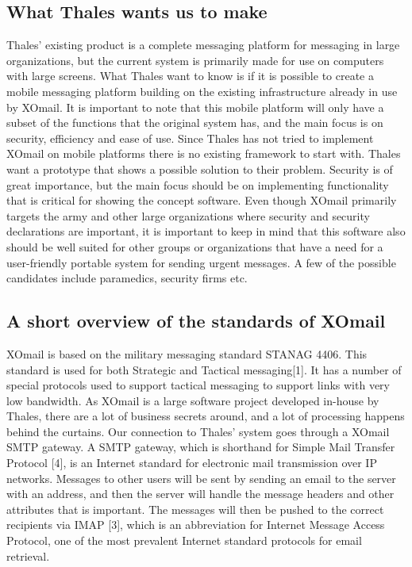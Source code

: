 \subsection*{What Thales wants us to make}
Thales’ existing product is a complete messaging platform for messaging in large organizations, but the current system is primarily made for use on computers with large screens. What Thales want to know is if it is possible to create a mobile messaging platform building on the existing infrastructure already in use by XOmail. It is important to note that this mobile platform will only have a subset of the functions that the original system has, and the main focus is on security, efficiency and ease of use.
\newline
\newline
Since Thales has not tried to implement XOmail on mobile platforms there is no existing framework to start with. Thales want a prototype that shows a possible solution to their problem. Security is of great importance, but the main focus should be on implementing functionality that is critical for showing the concept software.  
\newline
\newline
Even though XOmail primarily targets the army and other large organizations where security and security declarations are important, it is important to keep in mind that this software also should be well suited for other groups or organizations that have a need for a user-friendly portable system for sending urgent messages. A few of the possible candidates include paramedics, security firms etc. 

\subsection*{A short overview of the standards of XOmail}
XOmail is based on the military messaging standard STANAG 4406. This standard is used for both Strategic and Tactical messaging[1]. It has a number of special protocols used to support tactical messaging to support links with very low bandwidth.
\newline
\newline
As XOmail is a large software project developed in-house by Thales, there are a lot of business secrets around, and a lot of processing happens behind the curtains. Our connection to Thales’ system goes through a XOmail SMTP gateway. A SMTP gateway, which is shorthand for Simple Mail Transfer Protocol [4], is an Internet standard for electronic mail transmission over IP networks. Messages to other users will be sent by sending an email to the server with an address, and then the server will handle the message headers and other attributes that is important. The messages will then be pushed to the correct recipients via IMAP [3], which is an abbreviation for Internet Message Access Protocol, one of the most prevalent Internet standard protocols for email retrieval. 

